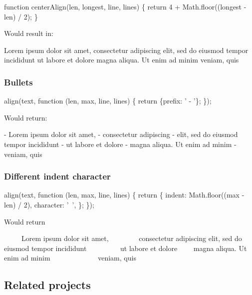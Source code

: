 \begin{DoxyCode}
function centerAlign(len, longest, line, lines) \{
  return 4 + Math.floor((longest - len) / 2);
\}
\end{DoxyCode}


Would result in\+:


\begin{DoxyCode}
     Lorem ipsum dolor sit amet,
        consectetur adipiscing
elit, sed do eiusmod tempor incididunt
         ut labore et dolore
    magna aliqua. Ut enim ad minim
             veniam, quis
\end{DoxyCode}


\subsubsection*{Bullets}


\begin{DoxyCode}
align(text, function (len, max, line, lines) \{
  return \{prefix: ' - '\};
\});
\end{DoxyCode}


Would return\+:


\begin{DoxyCode}
- Lorem ipsum dolor sit amet,
- consectetur adipiscing
- elit, sed do eiusmod tempor incididunt
- ut labore et dolore
- magna aliqua. Ut enim ad minim
- veniam, quis
\end{DoxyCode}


\subsubsection*{Different indent character}


\begin{DoxyCode}
align(text, function (len, max, line, lines) \{
  return \{ 
    indent: Math.floor((max - len) / 2), 
    character: '~', 
  \};
\});
\end{DoxyCode}


Would return


\begin{DoxyCode}
~~~~~Lorem ipsum dolor sit amet,
~~~~~~~~consectetur adipiscing
elit, sed do eiusmod tempor incididunt
~~~~~~~~~ut labore et dolore
~~~~magna aliqua. Ut enim ad minim
~~~~~~~~~~~~~veniam, quis
\end{DoxyCode}


\subsection*{Related projects}


